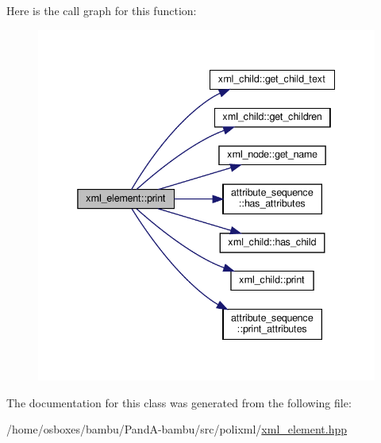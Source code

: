 Here is the call graph for this function\+:
\nopagebreak
\begin{figure}[H]
\begin{center}
\leavevmode
\includegraphics[width=338pt]{d8/d35/classxml__element_ac2a5c89bcbbfee04039fe93824489677_cgraph}
\end{center}
\end{figure}


The documentation for this class was generated from the following file\+:\begin{DoxyCompactItemize}
\item 
/home/osboxes/bambu/\+Pand\+A-\/bambu/src/polixml/\hyperlink{xml__element_8hpp}{xml\+\_\+element.\+hpp}\end{DoxyCompactItemize}
